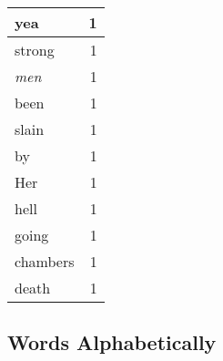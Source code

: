 \begin{center}
\begin{longtable}{l|r}
yea & 1\\ \hline 
strong & 1\\ \hline 
\emph{men} & 1\\ \hline 
been & 1\\ \hline 
slain & 1\\ \hline 
by & 1\\ \hline 
Her & 1\\ \hline 
hell & 1\\ \hline 
going & 1\\ \hline 
chambers & 1\\ \hline 
death & 1\\ \hline 
\end{longtable}  
\end{center}  


  
\normalsize  

  
  


\subsection{Words Alphabetically}

